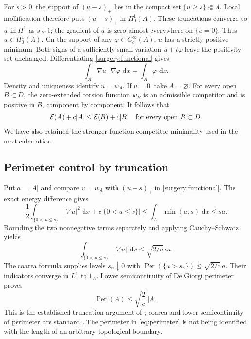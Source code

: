 \documentclass[11pt,reqno]{amsart}
\numberwithin{equation}{section}
\newcommand{\dd}{\,\mathrm d}
\newcommand{\abs}[1]{\lvert#1\rvert}
\begin{document}
For \(s>0\), the support of \((u-s)_+\) lies in the compact set
\(\{u\ge s\}\Subset A\).  Local mollification therefore puts
\((u-s)_+\) in \(H^1_0(A)\).  These truncations converge to \(u\)
in \(H^1\) as \(s\downarrow0\); the gradient of \(u\) is zero almost
everywhere on \(\{u=0\}\).  Thus \(u\in H^1_0(A)\).
On the support of any \(\varphi\in C^\infty_c(A)\), \(u\) has a
strictly positive minimum.  Both signs of a sufficiently small
variation \(u+t\varphi\) leave the positivity set unchanged.
Differentiating \eqref{surgery:functional} gives
\[
 \int_A\nabla u\cdot\nabla\varphi\,\dd x
 =\int_A\varphi\,\dd x.
\]
Density and uniqueness identify \(u=w_A\).  If \(u=0\), take
\(A=\varnothing\).  For every open \(B\subset D\), the zero-extended
torsion function \(w_B\) is an admissible competitor and is positive
in \(B\), component by component.  It follows that
\begin{equation}
 \mathcal E(A)+c\abs A
 \le \mathcal E(B)+c\abs B
 \quad\hbox{for every open }B\subset D.
 \label{surgery:set-minimum}
\end{equation}
We have also retained the stronger function-competitor minimality
used in the next calculation.

\subsection{Perimeter control by truncation}
\label{surgery:perimeter-section}

Put \(a=\abs A\) and compare \(u=w_A\) with \((u-s)_+\) in
\eqref{surgery:functional}.  The exact energy difference gives
\[
 \frac12\int_{\{0<u\le s\}}\abs{\nabla u}^2\,\dd x
       +c\abs{\{0<u\le s\}}
 \le \int_A\min(u,s)\,\dd x\le sa.
\]
Bounding the two nonnegative terms separately and applying
Cauchy--Schwarz yields
\[
 \int_{\{0<u\le s\}}\abs{\nabla u}\,\dd x
 \le \sqrt{2/c}\,sa.
\]
The coarea formula supplies levels \(s_n\downarrow0\) with
\(\operatorname{Per}(\{u>s_n\})\le\sqrt{2/c}\,a\).
Their indicators converge in \(L^1\) to \(1_A\).
Lower semicontinuity of De Giorgi perimeter proves
\begin{equation}
 \operatorname{Per}(A)\le\sqrt{\frac2c}\,\abs A.
 \label{eq:perimeter}
\end{equation}
This is the established truncation argument of
\cite[Theorem~2.2]{Bucur2012}; coarea and lower semicontinuity of
perimeter are standard \cite{EvansGariepy2015}.  The perimeter in
\eqref{eq:perimeter} is not being identified with the length of an
arbitrary topological boundary.
\end{document}
